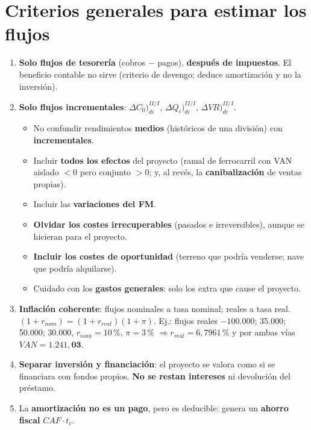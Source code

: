 \documentclass[10pt,a4paper,twoside]{article}
\newcommand{\di}{)_{di}}
\begin{document}
\begin{center}
\end{center}

\section{Criterios generales para estimar los flujos}
\begin{enumerate}
  \item \textbf{Solo flujos de tesorería} (cobros $-$ pagos), \textbf{después de impuestos}. El beneficio contable no sirve
        (criterio de devengo; deduce amortización y no la inversión).
  \item \textbf{Solo flujos incrementales}: $\Delta C_0\di^{II/I}$, $\Delta Q_i\di^{II/I}$, $\Delta VR\di^{II/I}$.
  \begin{itemize}
    \item No confundir rendimientos \textbf{medios} (históricos de una división) con \textbf{incrementales}.
    \item Incluir \textbf{todos los efectos} del proyecto (ramal de ferrocarril con VAN aislado $<0$ pero conjunto $>0$;
          y, al revés, la \textbf{canibalización} de ventas propias).
    \item Incluir las \textbf{variaciones del FM}.
    \item \textbf{Olvidar los costes irrecuperables} (pasados e irreversibles), aunque se hicieran para el proyecto.
    \item \textbf{Incluir los costes de oportunidad} (terreno que podría venderse; nave que podría alquilarse).
    \item Cuidado con los \textbf{gastos generales}: solo los extra que cause el proyecto.
  \end{itemize}
  \item \textbf{Inflación coherente}: flujos nominales a tasa nominal; reales a tasa real.
        $(1+r_{nom})=(1+r_{real})(1+\pi)$. Ej.: flujos reales $-100.000$; 35.000; 50.000; 30.000, $r_{nom}=10\,\%$, $\pi=3\,\%$
        $\Rightarrow r_{real}=6,7961\,\%$ y por ambas vías $VAN=\mathbf{1.241,03}$.
  \item \textbf{Separar inversión y financiación}: el proyecto se valora como si se financiara con fondos propios.
        \textbf{No se restan intereses} ni devolución del préstamo.
  \item La \textbf{amortización no es un pago}, pero es deducible: genera un \textbf{ahorro fiscal} $CAF\cdot t_c$.
\end{enumerate}
\end{document}
